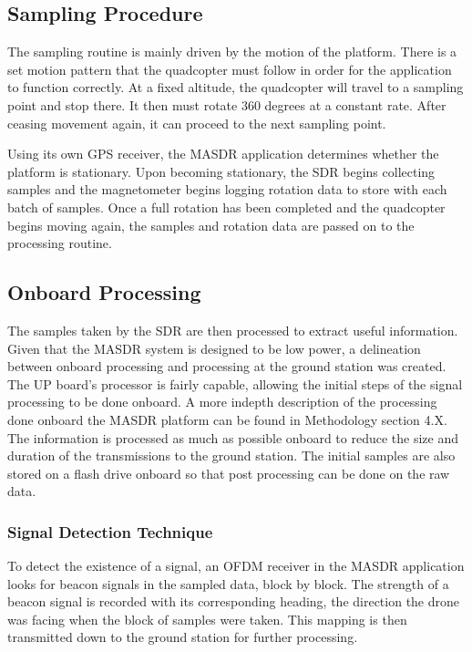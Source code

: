 \subsection{Sampling Procedure}
The sampling routine is mainly driven by the motion of the platform. There is a set motion pattern that the quadcopter must follow in order for the application to function correctly. At a fixed altitude, the quadcopter will travel to a sampling point and stop there. It then must rotate 360 degrees at a constant rate. After ceasing movement again, it can proceed to the next sampling point. \par
Using its own GPS receiver, the MASDR application determines whether the platform is stationary. Upon becoming stationary, the SDR begins collecting samples and the magnetometer begins logging rotation data to store with each batch of samples. Once a full rotation has been completed and the quadcopter begins moving again, the samples and rotation data are passed on to the processing routine.
\subsection{Onboard Processing}
The samples taken by the SDR are then processed to extract useful information. Given that the MASDR system is designed to be low power, a delineation between onboard processing and processing at the ground station was created. The UP board’s processor is fairly capable, allowing the initial steps of the signal processing to be done onboard. A more indepth description of the processing done onboard the MASDR platform can be found in Methodology section 4.X. The information is processed as much as possible onboard to reduce the size and duration of the transmissions to the ground station. The initial samples are also stored on a flash drive onboard so that post processing can be done on the raw data.
\subsubsection{Signal Detection Technique}
To detect the existence of a signal, an OFDM receiver in the MASDR application looks for beacon signals in the sampled data, block by block. The strength of a beacon signal is recorded with its corresponding heading, the direction the drone was facing when the block of samples were taken. This mapping is then transmitted down to the ground station for further processing.
